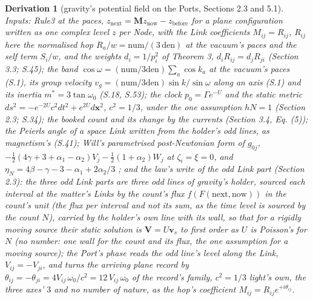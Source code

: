 \documentclass[pdflatex,sn-mathphys-num]{sn-jnl}
\newcommand{\num}{\mathrm{num}}
\newcommand{\den}{\mathrm{den}}
\theoremstyle{thmstyleone}
\newtheorem{derivation}{Derivation}
\begin{document}
\begin{derivation}[gravity's potential field on the Ports, Sections 2.3 and 5.1]
\emph{Inputs:} Rule3 at the paces, $z_{\mathrm{next}} = \mathbf M z_{\mathrm{now}} - z_{\mathrm{before}}$ for a plane configuration written as one complex level $z$ per Node, with the Link coefficients $M_{ij} = R_{ij}$, $R_{ij}$ here the normalised hop $R_a / w = \num / (3\,\den)$ at the vacuum's paces and the self term $S_i / w$, and the weights $d_i = 1 / p_i^2$ of Theorem 3, $d_i R_{ij} = d_j R_{ji}$ (Section 3.3; S.45); the band $\cos\omega = (\num / 3\den)\sum_a\cos k_a$ at the vacuum's paces (S.1), its group velocity $v_g = (\num / 3\den)\sin k / \sin\omega$ along an axis (S.1) and its inertia $m^* = 3\tan\omega_0$ (S.18, S.53); the clock $p_0 = \Gamma e^{-U}$ and the static metric $ds^2 = -e^{-2U}c^2dt^2 + e^{2U}d\mathbf x^2$, $c^2 = 1/3$, under the one assumption $hN = 1$ (Section 2.3; S.34); the booked count and its change by the currents (Section 3.4, Eq. (5)); the Peierls angle of a space Link written from the holder's odd lines, as magnetism's (S.41); Will's parametrised post-Newtonian form of $g_{0j}$, $-\tfrac12(4\gamma + 3 + \alpha_1 - \alpha_2)V_j - \tfrac12(1 + \alpha_2)W_j$ at $\zeta_i = \xi = 0$, and $\eta_N = 4\beta - \gamma - 3 - \alpha_1 + 2\alpha_2 / 3$ \cite{will}; and the law's write of the odd Link part (Section 2.3): the three odd Link parts are three odd lines of gravity's holder, sourced each interval at the matter's Links by the count's flux $f(F(\mathrm{next}, \mathrm{now}))$ in the count's unit (the flux per interval and not its sum, as the time level is sourced by the count $N$), carried by the holder's own line with its wall, so that for a rigidly moving source their static solution is $\mathbf V = U\mathbf v_s$ to first order as $U$ is Poisson's for $N$ (no number: one wall for the count and its flux, the one assumption for a moving source); the Port's phase reads the odd line's level along the Link, $V_{ij} = -V_{ji}$, and turns the arriving plane record by $\theta_{ij} = -\theta_{ji} = 4V_{ij}\,\omega_0 / c^2 = 12\,V_{ij}\,\omega_0$ of the record's family, $c^2 = 1/3$ light's own, the three axes' $3$ and no number of nature, as the hop's coefficient $M_{ij} = R_{ij}e^{+i\theta_{ij}}$.

\end{derivation}
\end{document}
